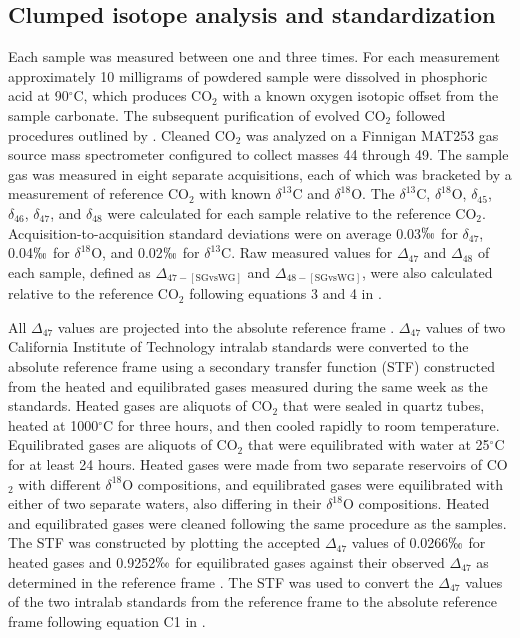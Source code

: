 \documentclass[5p, authoryear]{elsarticle}
\begin{document}
\subsection{Clumped isotope analysis and standardization}

Each sample was measured between one and three times. For each measurement approximately 10 milligrams of powdered sample were dissolved in phosphoric acid at 90$^{\circ}$C, which produces CO$_2$ with a known oxygen isotopic offset from the sample carbonate. The subsequent purification of evolved CO$_2$ followed procedures outlined by \cite{Ghosh2006}. Cleaned CO$_2$ was analyzed on a Finnigan MAT253 gas source mass spectrometer configured to collect masses 44 through 49. The sample gas was measured in eight separate acquisitions, each of which was bracketed by a measurement of reference CO$_2$ with known $\delta^{13}$C and $\delta^{18}$O. The $\delta^{13}$C, $\delta^{18}$O, $\delta_{45}$, $\delta_{46}$, $\delta_{47}$, and $\delta_{48}$ were calculated for each sample relative to the reference CO$_2$. Acquisition-to-acquisition standard deviations were on average 0.03$\permil$ for $\delta_{47}$, 0.04$\permil$ for $\delta^{18}$O, and 0.02$\permil$ for $\delta^{13}$C. Raw measured values for $\Delta_{47}$ and $\Delta_{48}$ of each sample, defined as $\Delta_{47-[\text{SGvsWG}]}$ and $\Delta_{48-[\text{SGvsWG}]}$, were also calculated relative to the reference CO$_2$ following equations 3 and 4 in \cite{Huntington2009}.

All $\Delta_{47}$ values are projected into the absolute reference frame \citep{Dennis2011}. $\Delta_{47}$ values of two California Institute of Technology intralab standards were converted to the absolute reference frame using a secondary transfer function (STF) constructed from the heated and equilibrated gases measured during the same week as the standards. Heated gases are aliquots of CO$_2$ that were sealed in quartz tubes, heated at 1000$^{\circ}$C for three hours, and then cooled rapidly to room temperature. Equilibrated gases are aliquots of CO$_2$ that were equilibrated with water at 25$^{\circ}$C for at least 24 hours. Heated gases were made from two separate reservoirs of CO$_2$ with different $\delta^{18}$O compositions, and equilibrated gases were equilibrated with either of two separate waters, also differing in their $\delta^{18}$O compositions. Heated and equilibrated gases were cleaned following the same procedure as the samples. The STF was constructed by plotting the accepted $\Delta_{47}$ values of 0.0266$\permil$ for heated gases and 0.9252$\permil$ for equilibrated gases against their observed $\Delta_{47}$ as determined in the \cite{Ghosh2006} reference frame \citep{Dennis2011}. The STF was used to convert the $\Delta_{47}$ values of the two intralab standards from the \cite{Ghosh2006} reference frame to the absolute reference frame following equation C1 in \cite{Dennis2011}. 
\end{document}
